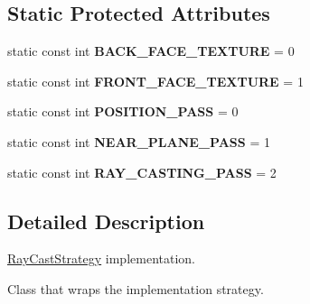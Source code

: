 \subsection*{\-Static \-Protected \-Attributes}
\begin{DoxyCompactItemize}
\item 
\hypertarget{class_verdi_1_1_ray_cast_strategy_a200e9bf5cd456e9f0d29470de0b787e4}{static const int {\bfseries \-B\-A\-C\-K\-\_\-\-F\-A\-C\-E\-\_\-\-T\-E\-X\-T\-U\-R\-E} = 0}\label{class_verdi_1_1_ray_cast_strategy_a200e9bf5cd456e9f0d29470de0b787e4}

\item 
\hypertarget{class_verdi_1_1_ray_cast_strategy_a8228044fb182692db928ad2fef96379c}{static const int {\bfseries \-F\-R\-O\-N\-T\-\_\-\-F\-A\-C\-E\-\_\-\-T\-E\-X\-T\-U\-R\-E} = 1}\label{class_verdi_1_1_ray_cast_strategy_a8228044fb182692db928ad2fef96379c}

\item 
\hypertarget{class_verdi_1_1_ray_cast_strategy_ad0336043eb38d83b6d0f049c93ec47bb}{static const int {\bfseries \-P\-O\-S\-I\-T\-I\-O\-N\-\_\-\-P\-A\-S\-S} = 0}\label{class_verdi_1_1_ray_cast_strategy_ad0336043eb38d83b6d0f049c93ec47bb}

\item 
\hypertarget{class_verdi_1_1_ray_cast_strategy_a0302885a52c30d994faa0b1330a35526}{static const int {\bfseries \-N\-E\-A\-R\-\_\-\-P\-L\-A\-N\-E\-\_\-\-P\-A\-S\-S} = 1}\label{class_verdi_1_1_ray_cast_strategy_a0302885a52c30d994faa0b1330a35526}

\item 
\hypertarget{class_verdi_1_1_ray_cast_strategy_af01611315064806d46e3513a247e7c71}{static const int {\bfseries \-R\-A\-Y\-\_\-\-C\-A\-S\-T\-I\-N\-G\-\_\-\-P\-A\-S\-S} = 2}\label{class_verdi_1_1_ray_cast_strategy_af01611315064806d46e3513a247e7c71}

\end{DoxyCompactItemize}


\subsection{\-Detailed \-Description}
\hyperlink{class_verdi_1_1_ray_cast_strategy}{\-Ray\-Cast\-Strategy} implementation.

\-Class that wraps the implementation strategy. 

